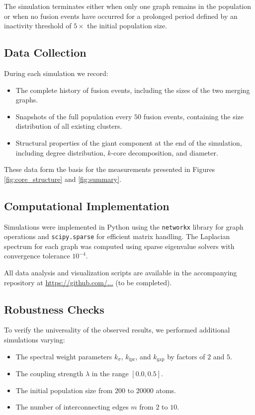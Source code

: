 \documentclass[11pt]{article}
\begin{document}
The simulation terminates either when only one graph remains in the population or when no fusion events have occurred for a prolonged period defined by an inactivity threshold of $5\times$ the initial population size.

\subsection{Data Collection}

During each simulation we record:

\begin{itemize}
\item The complete history of fusion events, including the sizes of the two merging graphs.
\item Snapshots of the full population every $50$ fusion events, containing the size distribution of all existing clusters.
\item Structural properties of the giant component at the end of the simulation, including degree distribution, $k$-core decomposition, and diameter.
\end{itemize}

These data form the basis for the measurements presented in Figures \ref{fig:core_structure} and \ref{fig:summary}.

\subsection{Computational Implementation}

Simulations were implemented in Python using the \texttt{networkx} library for graph operations and \texttt{scipy.sparse} for efficient matrix handling. 
The Laplacian spectrum for each graph was computed using sparse eigenvalue solvers with convergence tolerance $10^{-4}$.

All data analysis and visualization scripts are available in the accompanying repository at \url{https://github.com/...} (to be completed).

\subsection{Robustness Checks}

To verify the universality of the observed results, we performed additional simulations varying:

\begin{itemize}
\item The spectral weight parameters $k_\sigma$, $k_{\mathrm{ipr}}$, and $k_{\mathrm{gap}}$ by factors of $2$ and $5$.
\item The coupling strength $\lambda$ in the range $[0.0, 0.5]$.
\item The initial population size from $200$ to $20000$ atoms.
\item The number of interconnecting edges $m$ from $2$ to $10$.
\end{itemize}
\end{document}
